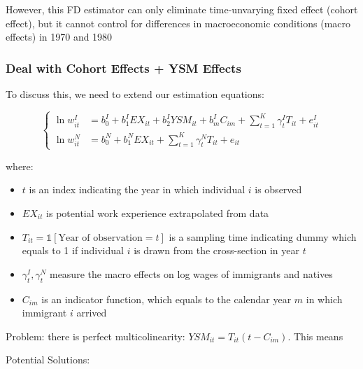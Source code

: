             However, this FD estimator can only eliminate time-unvarying fixed effect (cohort effect), but it cannot control for differences in macroeconomic conditions (macro effects) in 1970 and 1980

        
        \subsubsection{Deal with Cohort Effects + YSM Effects}

            To discuss this, we need to extend our estimation equations:

            \[
            \begin{cases}
            \ln w_{it}^I & = b_{0}^I + b_{1}^IEX_{it} + b_{2}^IYSM_{it} + b_{m}^IC_{im} + \sum_{ t=1 }^{ K }\gamma_{t}^IT_{it} + e_{it}^I \\
            \ln w_{it}^N & = b_{0}^N + b_{1}^NEX_{it} + \sum_{ t=1 }^{ K }\gamma_{t}^NT_{it} + e_{it}
            \end{cases}
            \]

            where:

            \begin{itemize}
                \item $t$ is an index indicating the year in which individual $i$ is observed
                \item $EX_{it}$ is potential work experience extrapolated from data
                \item $T_{it}=\mathds{1}[\text{Year of observation}=t]$ is a sampling time indicating dummy which equals to 1 if individual $i$ is drawn from the cross-section in year $t$
                \item $\gamma_{t}^I,\gamma_{t}^N$ measure the macro effects on log wages of immigrants and natives
                \item $C_{im}$ is an indicator function, which equals to the calendar year $m$ in which immigrant $i$ arrived
            \end{itemize}

            Problem: there is perfect multicolinearity: $YSM_{it}= T_{it}(t-C_{im})$. This means 

            Potential Solutions:

